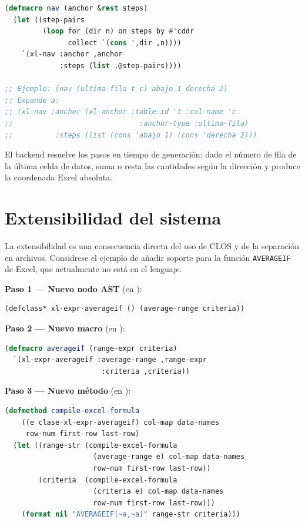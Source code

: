 \begin{lstlisting}[language=CommonLisp,
  caption={Implementaci\'on del macro nav.}]
(defmacro nav (anchor &rest steps)
  (let ((step-pairs
         (loop for (dir n) on steps by #'cddr
               collect `(cons ',dir ,n))))
    `(xl-nav :anchor ,anchor
             :steps (list ,@step-pairs))))

;; Ejemplo: (nav (ultima-fila t c) abajo 1 derecha 2)
;; Expande a:
;; (xl-nav :anchor (xl-anchor :table-id 't :col-name 'c
;;                              :anchor-type :ultima-fila)
;;          :steps (list (cons 'abajo 1) (cons 'derecha 2)))
\end{lstlisting}

El backend resuelve los pasos en tiempo de generaci\'on: dado el n\'umero de
fila de la \'ultima celda de datos, suma o resta las cantidades seg\'un la
direcci\'on y produce la coordenada Excel absoluta.

\section{Extensibilidad del sistema}
\label{sec:extensibilidad}

La extensibilidad es una consecuencia directa del uso de CLOS y de la
separaci\'on en archivos.  Considrese el ejemplo de a\~nadir soporte para
la funci\'on \texttt{AVERAGEIF} de Excel, que actualmente no est\'a en el
lenguaje.

\textbf{Paso 1 --- Nuevo nodo AST} (en ):
\begin{lstlisting}[language=CommonLisp]
(defclass* xl-expr-averageif () (average-range criteria))
\end{lstlisting}

\textbf{Paso 2 --- Nuevo macro} (en ):
\begin{lstlisting}[language=CommonLisp]
(defmacro averageif (range-expr criteria)
  `(xl-expr-averageif :average-range ,range-expr
                       :criteria ,criteria))
\end{lstlisting}

\textbf{Paso 3 --- Nuevo m\'etodo} (en ):
\begin{lstlisting}[language=CommonLisp]
(defmethod compile-excel-formula
    ((e clase-xl-expr-averageif) col-map data-names
     row-num first-row last-row)
  (let ((range-str (compile-excel-formula
                     (average-range e) col-map data-names
                     row-num first-row last-row))
        (criteria  (compile-excel-formula
                     (criteria e) col-map data-names
                     row-num first-row last-row)))
    (format nil "AVERAGEIF(~a,~a)" range-str criteria)))
\end{lstlisting}


